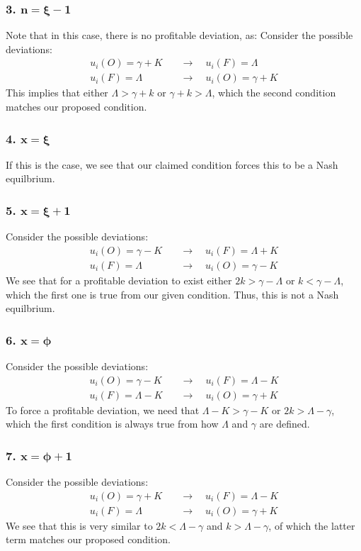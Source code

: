 \documentclass[12pt]{article}
\begin{document}
\subsubsection*{3. $\mathbf{n = \xi - 1}$} 
Note that in this case, there is no profitable deviation, as:
Consider the possible deviations:
\begin{align*}
    u_i(O) = \gamma + K \quad &\to \quad u_i(F) = \Lambda \\
    u_i(F) = \Lambda \quad &\to \quad u_i(O) = \gamma + K
\end{align*}
This implies that either $\Lambda > \gamma + k$ or $\gamma + k > \Lambda$, which the second condition matches our proposed condition. 
\subsubsection*{4. $\mathbf{x = \xi}$}
If this is the case, we see that our claimed condition forces this to be a Nash equilbrium. 
\subsubsection*{5. $\mathbf{x = \xi + 1}$}
Consider the possible deviations:
\begin{align*}
    u_i(O) = \gamma - K \quad &\to \quad u_i(F) = \Lambda + K \\
    u_i(F) = \Lambda \quad &\to \quad u_i(O) = \gamma - K
\end{align*}
We see that for a profitable deviation to exist either $2k > \gamma - \Lambda$ or $k < \gamma - \Lambda$, which the first one is true from our given condition. Thus, this is not a Nash equilbrium. 
\subsubsection*{6. $\mathbf{x = \phi}$}
Consider the possible deviations:
\begin{align*}
    u_i(O) = \gamma - K \quad &\to \quad u_i(F) = \Lambda - K \\
    u_i(F) = \Lambda - K\quad &\to \quad u_i(O) = \gamma + K
\end{align*}
To force a profitable deviation, we need that $\Lambda - K > \gamma - K$ or $2k > \Lambda - \gamma$, which the first condition is always true from how $\Lambda$ and $\gamma$ are defined. 
\subsubsection*{7. $\mathbf{x = \phi + 1}$}
Consider the possible deviations:
\begin{align*}
    u_i(O) = \gamma + K \quad &\to \quad u_i(F) = \Lambda - K \\
    u_i(F) = \Lambda \quad &\to \quad u_i(O) = \gamma + K
\end{align*}
We see that this is very similar to $2k < \Lambda - \gamma$ and $k > \Lambda - \gamma$, of which the latter term matches our proposed condition. 
\end{document}

